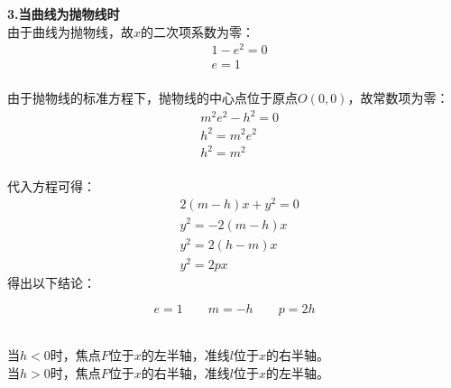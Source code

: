 \documentclass[UTF8]{ctexart}
\begin{document}
\newpage

    \textbf{3.当曲线为抛物线时}\\[3mm]
    \setcounter{equation}{0}
    由于曲线为抛物线，故$x$的二次项系数为零：
    \begin{align}
        &1-e^2=0\\[2mm]
        &e=1
    \end{align}\\
    由于抛物线的标准方程下，抛物线的中心点位于原点$O(0,0)$，故常数项为零：\vspace{3pt}
    \begin{align}
        &m^2e^2-h^2=0\\[2mm]
        &h^2=m^2e^2\\[2mm]
        &h^2=m^2
    \end{align}\\
    代入方程可得：
    \begin{align}
        &2(m-h)x+y^2=0\\[2mm]
        &y^2=-2(m-h)x\\[2mm]
        &y^2=2(h-m)x\\[2mm]
        &y^2=2px
    \end{align}
    得出以下结论：
    \begin{large}
        \begin{equation*}
            e=1\qquad m=-h\qquad p=2h
        \end{equation*}
    \end{large}\\
    当$h<0$时，焦点$F$位于$x$的左半轴，准线$l$位于$x$的右半轴。\\[2mm]
    当$h>0$时，焦点$F$位于$x$的右半轴，准线$l$位于$x$的左半轴。
\end{document}
